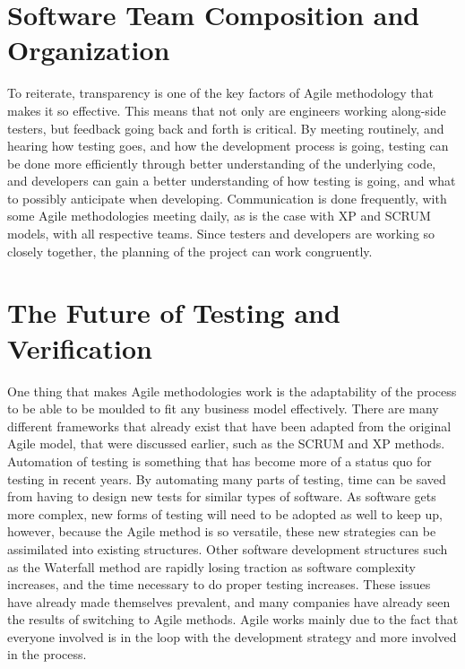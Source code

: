 \documentclass[conference]{IEEEtran}
\begin{document}
\section{Software Team Composition and Organization}
To reiterate, transparency is one of the key factors of Agile methodology that makes it so effective.  This means that not only are engineers working along-side testers, but feedback going back and forth is critical.  By meeting routinely, and hearing how testing goes, and how the development process is going, testing can be done more efficiently through better understanding of the underlying code, and developers can gain a better understanding of how testing is going, and what to possibly anticipate when developing.  Communication is done frequently, with some Agile methodologies meeting daily, as is the case with XP and SCRUM models, with all respective teams.\cite{ASS}  Since testers and developers are working so closely together, the planning of the project can work congruently. 
\section{The Future of Testing and Verification}
One thing that makes Agile methodologies work is the adaptability of the process to be able to be moulded to fit any business model effectively.  There are many different frameworks that already exist that have been adapted from the original Agile model, that were discussed earlier, such as the SCRUM and XP methods.  Automation of testing is something that has become more of a status quo for testing in recent years.  By automating many parts of testing, time can be saved from having to design new tests for similar types of software.  As software gets more complex, new forms of testing will need to be adopted as well to keep up, however, because the Agile method is so versatile, these new strategies can be assimilated into existing structures.  Other software development structures such as the Waterfall method are rapidly losing traction as software complexity increases, and the time necessary to do proper testing increases.  These issues have already made themselves prevalent, and many companies have already seen the results of switching to Agile methods.  Agile works mainly due to the fact that everyone involved is in the loop with the development strategy and more involved in the process.
\end{document}
